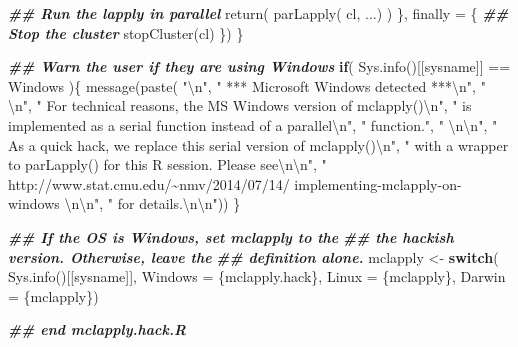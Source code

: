 \documentclass[
  12pt,
  american,
  a4paper,
  extrafontsizes,onecolumn,openright
  ]{memoir}
\newenvironment{Shaded}{\begin{snugshade}}{\end{snugshade}}
\newcommand{\AttributeTok}[1]{\textcolor[rgb]{0.77,0.63,0.00}{#1}}
\newcommand{\ControlFlowTok}[1]{\textcolor[rgb]{0.13,0.29,0.53}{\textbf{#1}}}
\newcommand{\DocumentationTok}[1]{\textcolor[rgb]{0.56,0.35,0.01}{\textbf{\textit{#1}}}}
\newcommand{\FunctionTok}[1]{\textcolor[rgb]{0.00,0.00,0.00}{#1}}
\newcommand{\NormalTok}[1]{#1}
\newcommand{\OtherTok}[1]{\textcolor[rgb]{0.56,0.35,0.01}{#1}}
\newcommand{\SpecialCharTok}[1]{\textcolor[rgb]{0.00,0.00,0.00}{#1}}
\newcommand{\StringTok}[1]{\textcolor[rgb]{0.31,0.60,0.02}{#1}}
\begin{document}
\begin{Shaded}
\begin{Highlighting}[]
    \DocumentationTok{\#\# Run the lapply in parallel }
    \FunctionTok{return}\NormalTok{( }\FunctionTok{parLapply}\NormalTok{( cl, ...) )}
\NormalTok{  \}, }\AttributeTok{finally =}\NormalTok{ \{        }
    \DocumentationTok{\#\# Stop the cluster}
    \FunctionTok{stopCluster}\NormalTok{(cl)}
\NormalTok{  \})}
\NormalTok{\}}

\DocumentationTok{\#\# Warn the user if they are using Windows}
\ControlFlowTok{if}\NormalTok{( }\FunctionTok{Sys.info}\NormalTok{()[[}\StringTok{\textquotesingle{}sysname\textquotesingle{}}\NormalTok{]] }\SpecialCharTok{==} \StringTok{\textquotesingle{}Windows\textquotesingle{}}\NormalTok{ )\{}
  \FunctionTok{message}\NormalTok{(}\FunctionTok{paste}\NormalTok{(}
    \StringTok{"}\SpecialCharTok{\textbackslash{}n}\StringTok{"}\NormalTok{, }
    \StringTok{"   *** Microsoft Windows detected ***}\SpecialCharTok{\textbackslash{}n}\StringTok{"}\NormalTok{,}
    \StringTok{"   }\SpecialCharTok{\textbackslash{}n}\StringTok{"}\NormalTok{,}
    \StringTok{"   For technical reasons, the MS Windows version of mclapply()}\SpecialCharTok{\textbackslash{}n}\StringTok{"}\NormalTok{,}
    \StringTok{"   is implemented as a serial function instead of a parallel}\SpecialCharTok{\textbackslash{}n}\StringTok{"}\NormalTok{,}
    \StringTok{"   function."}\NormalTok{,}
    \StringTok{"   }\SpecialCharTok{\textbackslash{}n\textbackslash{}n}\StringTok{"}\NormalTok{,}
    \StringTok{"   As a quick hack, we replace this serial version of mclapply()}\SpecialCharTok{\textbackslash{}n}\StringTok{"}\NormalTok{,}
    \StringTok{"   with a wrapper to parLapply() for this R session. Please see}\SpecialCharTok{\textbackslash{}n\textbackslash{}n}\StringTok{"}\NormalTok{,}
    \StringTok{"     http://www.stat.cmu.edu/\textasciitilde{}nmv/2014/07/14/}
\StringTok{    implementing{-}mclapply{-}on{-}windows }\SpecialCharTok{\textbackslash{}n\textbackslash{}n}\StringTok{"}\NormalTok{,}
    \StringTok{"   for details.}\SpecialCharTok{\textbackslash{}n\textbackslash{}n}\StringTok{"}\NormalTok{))}
\NormalTok{\}}

\DocumentationTok{\#\# If the OS is Windows, set mclapply to the}
\DocumentationTok{\#\# the hackish version. Otherwise, leave the}
\DocumentationTok{\#\# definition alone. }
\NormalTok{mclapply }\OtherTok{\textless{}{-}} \ControlFlowTok{switch}\NormalTok{( }\FunctionTok{Sys.info}\NormalTok{()[[}\StringTok{\textquotesingle{}sysname\textquotesingle{}}\NormalTok{]],}
                    \AttributeTok{Windows =}\NormalTok{ \{mclapply.hack\}, }
                    \AttributeTok{Linux   =}\NormalTok{ \{mclapply\},}
                    \AttributeTok{Darwin  =}\NormalTok{ \{mclapply\})}

\DocumentationTok{\#\# end mclapply.hack.R}
\end{Highlighting}
\end{Shaded}
\end{document}
